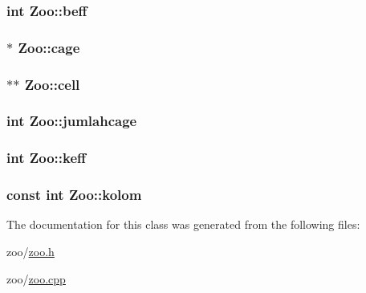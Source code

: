 \subsubsection[{\texorpdfstring{beff}{beff}}]{\setlength{\rightskip}{0pt plus 5cm}int Zoo\+::beff\hspace{0.3cm}{\ttfamily [private]}}\hypertarget{classZoo_a859a09c6586ebfe53dc7504d0219e7cb}{}\label{classZoo_a859a09c6586ebfe53dc7504d0219e7cb}
\subsubsection[{\texorpdfstring{cage}{cage}}]{$\ast$ Zoo\+::cage\hspace{0.3cm}{\ttfamily [private]}}\hypertarget{classZoo_a92269930ce6363c83b2b8fc7c8abd81d}{}\label{classZoo_a92269930ce6363c83b2b8fc7c8abd81d}
\subsubsection[{\texorpdfstring{cell}{cell}}]{$\ast$$\ast$ Zoo\+::cell\hspace{0.3cm}{\ttfamily [private]}}\hypertarget{classZoo_a264dc6d031ca713ca28969120bb599ab}{}\label{classZoo_a264dc6d031ca713ca28969120bb599ab}
\subsubsection[{\texorpdfstring{jumlahcage}{jumlahcage}}]{\setlength{\rightskip}{0pt plus 5cm}int Zoo\+::jumlahcage\hspace{0.3cm}{\ttfamily [private]}}\hypertarget{classZoo_ab9db4289e7ecd6856e4b7329dbde19d6}{}\label{classZoo_ab9db4289e7ecd6856e4b7329dbde19d6}
\subsubsection[{\texorpdfstring{keff}{keff}}]{\setlength{\rightskip}{0pt plus 5cm}int Zoo\+::keff\hspace{0.3cm}{\ttfamily [private]}}\hypertarget{classZoo_a9e90eb77a17d3767773b2a660d0ce981}{}\label{classZoo_a9e90eb77a17d3767773b2a660d0ce981}
\subsubsection[{\texorpdfstring{kolom}{kolom}}]{\setlength{\rightskip}{0pt plus 5cm}const int Zoo\+::kolom\hspace{0.3cm}{\ttfamily [private]}}\hypertarget{classZoo_a5ac40c8ba9d8a115c90c2aad733ee59c}{}\label{classZoo_a5ac40c8ba9d8a115c90c2aad733ee59c}


The documentation for this class was generated from the following files\+:\begin{DoxyCompactItemize}
\item 
zoo/\hyperlink{zoo_8h}{zoo.\+h}\item 
zoo/\hyperlink{zoo_8cpp}{zoo.\+cpp}\end{DoxyCompactItemize}
